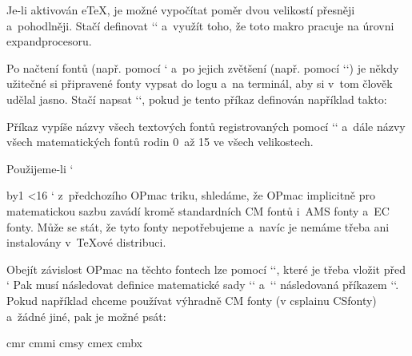 Je-li aktivován eTeX, je možné vypočítat poměr dvou velikostí přesněji a~pohodlněji. Stačí definovat `\dividedimen` a~využít toho, že toto makro pracuje na úrovni expandprocesoru. 

\begtt
\def\dividedimen (#1/#2){\expandafter\ignorept\the 
   \dimexpr\numexpr\number\dimexpr#1\relax*65536/\number\dimexpr#2\relax\relax sp\relax 
} 
\def\calculatefontdim#1{%
   \setbox0=\hbox{\thefont #1}%
   \fontdim=\dividedimen(\bw/\wd0)\fontdim 
} 
\endtt

 


Po načtení fontů (např. pomocí ` a~po jejich zvětšení (např. pomocí `\typosize[11/13]`) je někdy užitečné si připravené fonty vypsat do logu a~na terminál, aby si v~tom člověk udělal jasno. Stačí napsat `\showfonts`, pokud je tento příkaz definován například takto: 

\begtt
\def\showfonts{\bgroup 
   \def\wterm##1{\immediate\write16{##1}} 
   \def\resizefont##1{\wterm{##1= \fontname##1}}\resizeall 
   \tmpnum=0 \loop 
      \wterm{\the\tmpnum: \fontname\textfont\tmpnum\space/ 
                          \fontname\scriptfont\tmpnum\space/ 
                          \fontname\scriptscriptfont\tmpnum} 
      \advance\tmpnum by1 \ifnum\tmpnum<16 \repeat 
   \egroup} 
\endtt


Příkaz vypíše názvy všech textových fontů registrovaných pomocí `\regfont` a~dále názvy všech matematických fontů rodin 0~až 15 ve všech velikostech. 


 


Použijeme-li `\showfonts` z~předchozího OPmac triku, shledáme, že OPmac implicitně pro matematickou sazbu zavádí kromě standardních CM fontů i~AMS fonty a~EC fonty. Může se stát, že tyto fonty nepotřebujeme a~navíc je nemáme třeba ani instalovány v~TeXové distribuci. 



Obejít závislost OPmac na těchto fontech lze pomocí `\let\normalmathloading=\relax`, které je třeba vložit před ` Pak musí následovat definice matematické sady `\normalmath` a~`\boldmath` následovaná příkazem `\normalmath`. Pokud například chceme používat výhradně CM fonty (v csplainu CSfonty) a~žádné jiné, pak je možné psát: 

\begtt
\let\normalmathloading=\relax 
 
 
\def\normalmath{%
  \loadmathfamily 0 cmr  %
  \loadmathfamily 1 cmmi %
  \loadmathfamily 2 cmsy %
  \loadmathfamily 3 cmex %
  \loadmathfamily 8 cmbx %
  \setmathfamily  9 \tenbi %
  \setmathfamily 10 \tenrm 
  \setmathfamily 11 \tenit 
  \setmathdimens 
} 
\def\boldmath{%
  \loadmathfamily 0 cmbx  %
  \loadmathfamily 1 cmmib %
  \loadmathfamily 2 cmbsy %
  \loadmathfamily 3 cmex  %
  \loadmathfamily 8 cmbx  %
  \setmathfamily  9 \tenbi %
   \tenrm 
   \tenit 
  \setmathdimens 
} 
\normalmath 
\endtt


